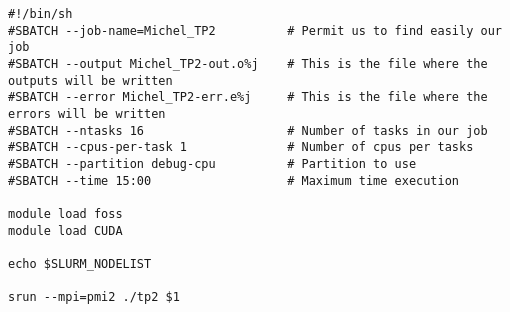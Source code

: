 \documentclass[11pt]{article}
\begin{document}
\begin{verbatim}
#!/bin/sh
#SBATCH --job-name=Michel_TP2          # Permit us to find easily our job
#SBATCH --output Michel_TP2-out.o%j    # This is the file where the outputs will be written
#SBATCH --error Michel_TP2-err.e%j     # This is the file where the errors will be written
#SBATCH --ntasks 16                    # Number of tasks in our job
#SBATCH --cpus-per-task 1              # Number of cpus per tasks
#SBATCH --partition debug-cpu          # Partition to use
#SBATCH --time 15:00                   # Maximum time execution

module load foss
module load CUDA

echo $SLURM_NODELIST

srun --mpi=pmi2 ./tp2 $1
\end{verbatim}
\end{document}

